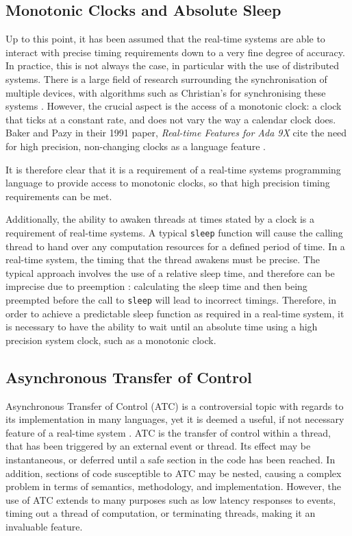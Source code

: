\subsection{Monotonic Clocks and Absolute Sleep}
Up to this point, it has been assumed that the real-time systems are able to
interact with precise timing requirements down to a very fine degree of
accuracy.  In practice, this is not always the case, in particular with the use
of distributed systems. There is a large field of research surrounding the
synchronisation of multiple devices, with algorithms such as Christian's for
synchronising these systems \cite{37958}. However, the crucial aspect is the
access of a monotonic clock: a clock that ticks at a constant rate, and does
not vary the way a calendar clock does. Baker and Pazy in their 1991 paper,
\emph{ Real-time Features for Ada 9X} cite the need for high precision,
non-changing clocks as a language feature \cite{160371}.  
\par\bigskip\noindent
It is therefore clear that it is a requirement of a real-time systems
programming language to provide access to monotonic clocks, so that high
precision timing requirements can be met.  
\par\bigskip\noindent
Additionally,
the ability to awaken threads at times stated by a clock is a requirement of
real-time systems. A typical \texttt{sleep} function will cause the calling
thread to hand over any computation resources for a defined period of time.  In
a real-time system, the timing that the thread awakens must be precise.  The
typical approach involves the use of a relative sleep time, and therefore can
be imprecise due to preemption \cite{real-time-systems}: calculating the sleep
time and then being preempted before the call to \texttt{sleep} will lead to
incorrect timings. Therefore, in order to achieve a predictable sleep function
as required in a real-time system, it is necessary to have the ability to wait
until an absolute time using a high precision system clock, such as a monotonic
clock.

\subsection{Asynchronous Transfer of Control}
Asynchronous Transfer of Control (ATC) is a controversial topic with regards to
its implementation in many languages, yet it is deemed a useful, if not
necessary feature of a real-time system \cite{atc-article}.  ATC is the
transfer of control within a thread, that has been triggered by an external
event or thread.  Its effect may be instantaneous, or deferred until a safe
section in the code has been reached. In addition, sections of code susceptible
to ATC may be nested, causing a complex problem in terms of semantics,
methodology, and implementation.  However, the use of ATC extends to many
purposes such as low latency responses to events, timing out a thread of
computation, or terminating threads, making it an invaluable feature. 

